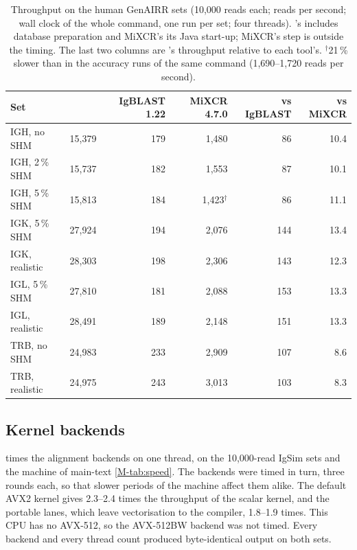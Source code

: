 \documentclass[11pt,a4paper]{article}
\begin{document}
\begin{table}[tbp]
\centering
\caption{Throughput on the human GenAIRR sets (10,000 reads each; reads per
second; wall clock of the whole command, one run per set; four threads).
\swig's includes database preparation and MiXCR's its Java start-up; MiXCR's
 step is outside the timing. The last two columns are
\swig's throughput relative to each tool's. $^\dagger$21\,\% slower than in
the accuracy runs of the same command (1,690--1,720 reads per second).}
\label{tab:genairr-speed}
\footnotesize
\begin{tabular}{@{}l rrr rr@{}}
\toprule
Set & \swig{} & IgBLAST 1.22 & MiXCR 4.7.0 & vs IgBLAST & vs MiXCR \\
\midrule
IGH, no SHM      & 15,379 & 179 & 1,480 & 86  & 10.4 \\
IGH, 2\,\% SHM   & 15,737 & 182 & 1,553 & 87  & 10.1 \\
IGH, 5\,\% SHM   & 15,813 & 184 & 1,423$^\dagger$ & 86  & 11.1 \\
IGK, 5\,\% SHM   & 27,924 & 194 & 2,076 & 144 & 13.4 \\
IGK, realistic   & 28,303 & 198 & 2,306 & 143 & 12.3 \\
IGL, 5\,\% SHM   & 27,810 & 181 & 2,088 & 153 & 13.3 \\
IGL, realistic   & 28,491 & 189 & 2,148 & 151 & 13.3 \\
TRB, no SHM      & 24,983 & 233 & 2,909 & 107 & 8.6  \\
TRB, realistic   & 24,975 & 243 & 3,013 & 103 & 8.3  \\
\bottomrule
\end{tabular}
\end{table}

\subsection{Kernel backends}
\label{sec:kernels}

 times the alignment backends on one thread, on the
10,000-read IgSim sets and the machine of main-text \cref{M-tab:speed}. The
backends were timed in turn, three rounds each, so that slower periods of
the machine affect them alike. The default AVX2 kernel gives 2.3--2.4 times
the throughput of the scalar kernel, and the portable lanes, which leave
vectorisation to the compiler, 1.8--1.9 times. This CPU has no AVX-512, so
the AVX-512BW backend was not timed. Every backend and every thread count
produced byte-identical output on both sets.
\end{document}
